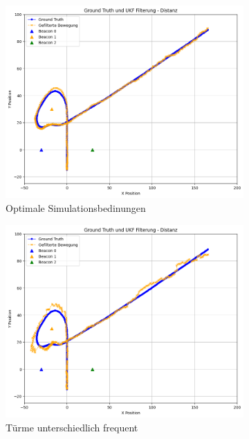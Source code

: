 \begin{figure}
    \begin{subfigure}{.333\textwidth}
        \centering
        \includegraphics[width=.9\linewidth]{Ergebnisse/plots_fahrten/distanz/distanz_dyn_acc_basic.png}  
        \caption{Optimale Simulationsbedinungen}
    \end{subfigure}    
    \begin{subfigure}{.333\textwidth}
        \centering
        \includegraphics[width=.9\linewidth]{Ergebnisse/plots_fahrten/distanz/distanz_dyn_acc_freq.png} 
        \caption{Türme unterschiedlich frequent}
    \end{subfigure}    
    \begin{subfigure}{.333\textwidth}
        \centering

\end{subfigure}
\end{figure}
